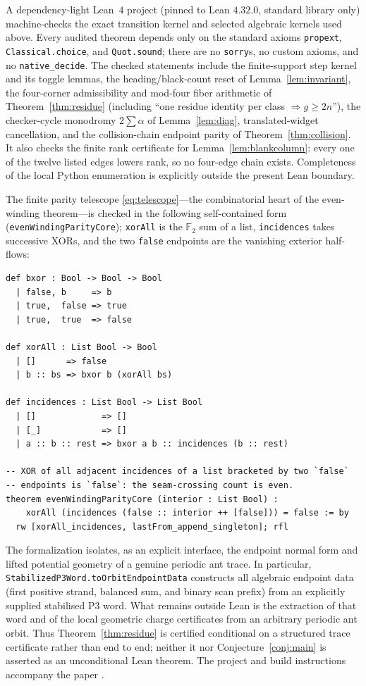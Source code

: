 \documentclass[11pt,reqno]{amsart}
\theoremstyle{plain}
\theoremstyle{definition}
\newcommand{\F}{\mathbb{F}}
\newcommand{\growth}{g}
\begin{document}
A dependency-light Lean~$4$ project (pinned to Lean $4.32.0$, standard library only)
machine-checks the exact transition kernel and selected algebraic kernels used above.
Every audited theorem depends only on the standard axioms
\texttt{propext}, \texttt{Classical.choice}, and \texttt{Quot.sound}; there are no
\texttt{sorry}s, no custom axioms, and no \texttt{native\_decide}. The checked
statements include the finite-support step kernel and its toggle lemmas, the
heading/black-count reset of Lemma~\ref{lem:invariant}, the four-corner admissibility
and mod-four fiber arithmetic of Theorem~\ref{thm:residue} (including
``one residue identity per class $\Rightarrow\growth\ge2n$''), the checker-cycle
monodromy $2\sum\alpha$ of Lemma~\ref{lem:diag}, translated-widget cancellation, and
the collision-chain endpoint parity of Theorem~\ref{thm:collision}.  It also checks
the finite rank certificate for Lemma~\ref{lem:blankcolumn}: every one of the twelve
listed edges lowers rank, so no four-edge chain exists.  Completeness of the local
Python enumeration is explicitly outside the present Lean boundary.

The finite parity telescope \eqref{eq:telescope}---the combinatorial heart of the
even-winding theorem---is checked in the following self-contained form
(\texttt{evenWindingParityCore}); \texttt{xorAll} is the $\F_2$ sum of a list,
\texttt{incidences} takes successive XORs, and the two \texttt{false} endpoints are
the vanishing exterior half-flows:

\begin{lstlisting}[style=lean]
def bxor : Bool -> Bool -> Bool
  | false, b     => b
  | true,  false => true
  | true,  true  => false

def xorAll : List Bool -> Bool
  | []      => false
  | b :: bs => bxor b (xorAll bs)

def incidences : List Bool -> List Bool
  | []             => []
  | [_]            => []
  | a :: b :: rest => bxor a b :: incidences (b :: rest)

-- XOR of all adjacent incidences of a list bracketed by two `false`
-- endpoints is `false`: the seam-crossing count is even.
theorem evenWindingParityCore (interior : List Bool) :
    xorAll (incidences (false :: interior ++ [false])) = false := by
  rw [xorAll_incidences, lastFrom_append_singleton]; rfl
\end{lstlisting}

The formalization isolates, as an explicit interface, the endpoint normal form and
lifted potential geometry of a genuine periodic ant trace. In particular,
\texttt{StabilizedP3Word.toOrbitEndpointData} constructs all algebraic endpoint data
(first positive strand, balanced sum, and binary scan prefix) from an explicitly
supplied stabilised P3 word. What remains outside Lean is the extraction of that word
and of the local geometric charge certificates from an arbitrary periodic ant orbit.
Thus Theorem~\ref{thm:residue} is certified conditional on a structured trace
certificate rather than end to end; neither it nor Conjecture~\ref{conj:main} is
asserted as an unconditional Lean theorem. The project and build instructions
accompany the paper \cite{Repo}.
\end{document}
